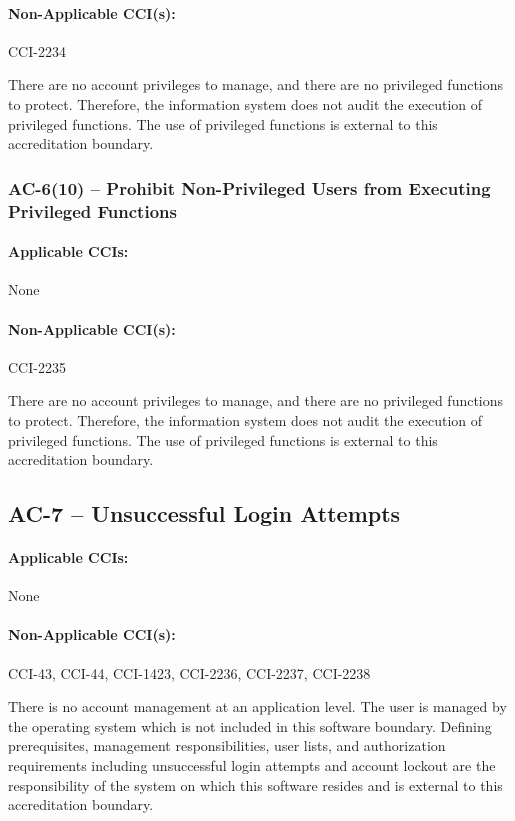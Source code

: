 \documentclass[letterpaper, 10pt, twoside]{article}
\begin{document}
\paragraph{Non-Applicable CCI(s):} CCI-2234

There are no account privileges to manage, and there are no privileged functions to protect. Therefore, the information system does not audit the execution of privileged functions. The use of privileged functions is external to this accreditation boundary.

\subsubsection{AC-6(10) -- Prohibit Non-Privileged Users from Executing Privileged Functions}

\paragraph{Applicable CCIs:} None

\paragraph{Non-Applicable CCI(s):} CCI-2235

There are no account privileges to manage, and there are no privileged functions to protect. Therefore, the information system does not audit the execution of privileged functions. The use of privileged functions is external to this accreditation boundary.

\subsection{AC-7 -- Unsuccessful Login Attempts}

\paragraph{Applicable CCIs:} None

\paragraph{Non-Applicable CCI(s):} CCI-43, CCI-44, CCI-1423, CCI-2236, CCI-2237, CCI-2238

There is no account management at an application level. The user is managed by the operating system which is not included in this software boundary. Defining prerequisites, management responsibilities, user lists, and authorization requirements including unsuccessful login attempts and account lockout are the responsibility of the system on which this software resides and is external to this accreditation boundary.
\end{document}

